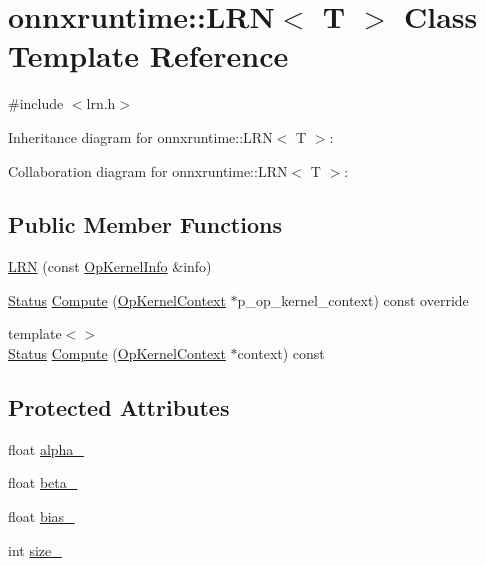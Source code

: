\hypertarget{classonnxruntime_1_1LRN}{}\section{onnxruntime\+:\+:L\+RN$<$ T $>$ Class Template Reference}
\label{classonnxruntime_1_1LRN}


{\ttfamily \#include $<$lrn.\+h$>$}



Inheritance diagram for onnxruntime\+:\+:L\+RN$<$ T $>$\+:


Collaboration diagram for onnxruntime\+:\+:L\+RN$<$ T $>$\+:
\subsection*{Public Member Functions}
\begin{DoxyCompactItemize}
\item 
\mbox{\hyperlink{classonnxruntime_1_1LRN_aafd00073623f8b5491667abd25b81ae7}{L\+RN}} (const \mbox{\hyperlink{classonnxruntime_1_1OpKernelInfo}{Op\+Kernel\+Info}} \&info)
\item 
\mbox{\hyperlink{classonnxruntime_1_1common_1_1Status}{Status}} \mbox{\hyperlink{classonnxruntime_1_1LRN_ada28bb5cd885b738d8ed17e738a35ed7}{Compute}} (\mbox{\hyperlink{classonnxruntime_1_1OpKernelContext}{Op\+Kernel\+Context}} $\ast$p\+\_\+op\+\_\+kernel\+\_\+context) const override
\item 
{\footnotesize template$<$$>$ }\\\mbox{\hyperlink{classonnxruntime_1_1common_1_1Status}{Status}} \mbox{\hyperlink{classonnxruntime_1_1LRN_a1d387326090789f94aa5ddba6432a8a4}{Compute}} (\mbox{\hyperlink{classonnxruntime_1_1OpKernelContext}{Op\+Kernel\+Context}} $\ast$context) const
\end{DoxyCompactItemize}
\subsection*{Protected Attributes}
\begin{DoxyCompactItemize}
\item 
float \mbox{\hyperlink{classonnxruntime_1_1LRN_aefd9baabbd775eeae8702f4d508fb1ea}{alpha\+\_\+}}
\item 
float \mbox{\hyperlink{classonnxruntime_1_1LRN_a690f2ff9893fad8423d0534af3e04869}{beta\+\_\+}}
\item 
float \mbox{\hyperlink{classonnxruntime_1_1LRN_a94db5cd6e1d3ffebdee9413a08af9d90}{bias\+\_\+}}
\item 
int \mbox{\hyperlink{classonnxruntime_1_1LRN_a4b87739b763f4acccd164dfd4c3397cb}{size\+\_\+}}
\end{DoxyCompactItemize}
